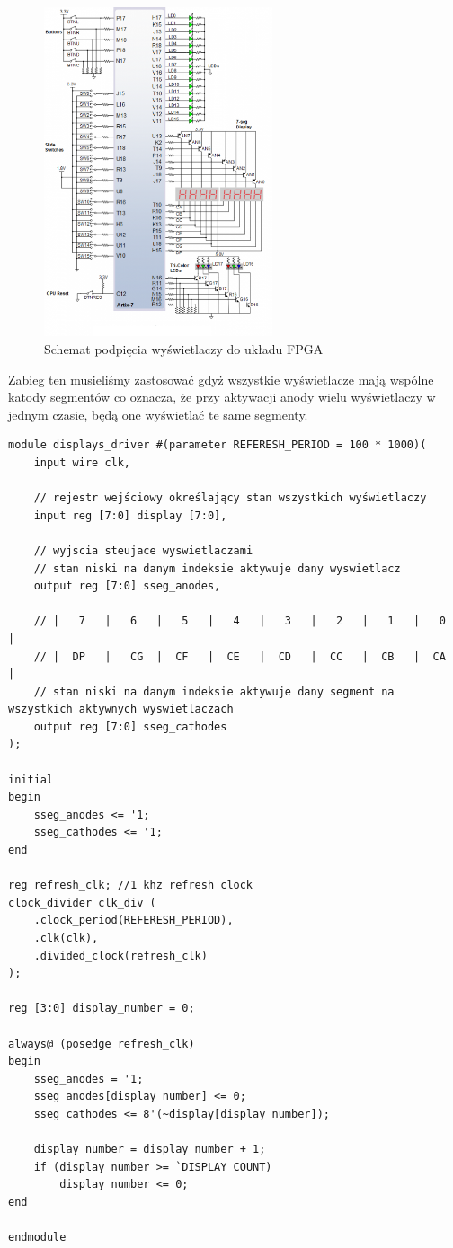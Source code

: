 \documentclass[a4paper]{article}
\begin{document}
\begin{figure}[H]
    \centering
    \includegraphics[width=0.6\textwidth]{fpga_led_diagram.png}
    \caption{Schemat podpięcia wyświetlaczy do układu FPGA}
\end{figure}

Zabieg ten musieliśmy zastosować gdyż wszystkie wyświetlacze 
mają wspólne katody segmentów co oznacza, że przy aktywacji 
anody wielu wyświetlaczy w jednym czasie, będą one wyświetlać te same 
segmenty.

\begin{verbatim}
module displays_driver #(parameter REFERESH_PERIOD = 100 * 1000)(
    input wire clk,
    
    // rejestr wejściowy określający stan wszystkich wyświetlaczy
    input reg [7:0] display [7:0],
    
    // wyjscia steujace wyswietlaczami
    // stan niski na danym indeksie aktywuje dany wyswietlacz
    output reg [7:0] sseg_anodes,
    
    // |   7   |   6   |   5   |   4   |   3   |   2   |   1   |   0   |
    // |  DP   |   CG  |  CF   |  CE   |  CD   |  CC   |  CB   |  CA   |
    // stan niski na danym indeksie aktywuje dany segment na wszystkich aktywnych wyswietlaczach
    output reg [7:0] sseg_cathodes
);

initial 
begin
    sseg_anodes <= '1;
    sseg_cathodes <= '1;
end

reg refresh_clk; //1 khz refresh clock
clock_divider clk_div (
    .clock_period(REFERESH_PERIOD),
    .clk(clk),
    .divided_clock(refresh_clk)
);

reg [3:0] display_number = 0;

always@ (posedge refresh_clk)
begin 
    sseg_anodes = '1;
    sseg_anodes[display_number] <= 0;
    sseg_cathodes <= 8'(~display[display_number]);
    
    display_number = display_number + 1;
    if (display_number >= `DISPLAY_COUNT)
        display_number <= 0;
end

endmodule
\end{verbatim}
\end{document}
